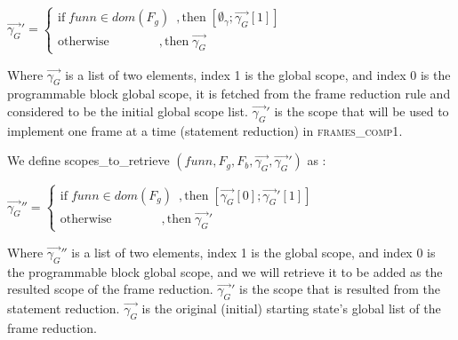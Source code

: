 \documentclass[UTF8]{article}
\begin{document}
 $  \overrightarrow{\gamma_G}' =\begin{cases}
            \mathrm{if} \; funn \in dom(F_g)    \hspace{6pt} ,
            \mathrm{then} \; [ \emptyset_{\gamma} ; \overrightarrow{\gamma_G}[1] ] \\
            \mathrm{otherwise}    \hspace{48pt}     , 
            \mathrm{then} \; \overrightarrow{\gamma_G} 
        \end{cases}$     \vspace{10pt}

Where $\overrightarrow{\gamma_G}$ is a list of two elements, index 1 is the global scope, and index 0 is the programmable block global scope, it is fetched from the frame reduction rule and considered to be the initial global scope list. $\overrightarrow{\gamma_G}'$ is the scope that will be used to implement one frame at a time (statement reduction) in \textsc{frames\_comp1}.

We define scopes\_to\_retrieve $( funn, F_g , F_b , \overrightarrow{\gamma_G}, \overrightarrow{\gamma_G}')$ as : \vspace{10pt}

 $  \overrightarrow{\gamma_G}'' =\begin{cases}
            \mathrm{if} \; funn \in dom(F_g)    \hspace{6pt} ,
            \mathrm{then} \; [\overrightarrow{\gamma_G}[0];\overrightarrow{\gamma_G}'[1]]  \\
            \mathrm{otherwise}    \hspace{48pt}     , 
            \mathrm{then} \; \overrightarrow{\gamma_G}' 
        \end{cases}$   \vspace{10pt}

Where $\overrightarrow{\gamma_G}''$ is a list of two elements, index 1 is the global scope, and index 0 is the programmable block global scope, and we will retrieve it to be added as the resulted scope of the frame reduction.
$\overrightarrow{\gamma_G}'$ is the scope that is resulted from the statement reduction. 
$\overrightarrow{\gamma_G}$ is the original (initial) starting state's global list of the frame reduction. 
\end{document}
